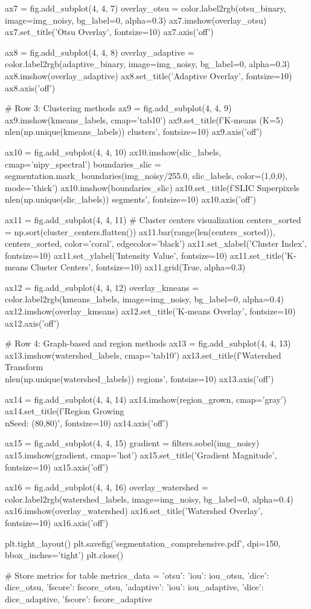 \documentclass[a4paper, 11pt]{article}
\begin{document}
\begin{pycode}
ax7 = fig.add_subplot(4, 4, 7)
overlay_otsu = color.label2rgb(otsu_binary, image=img_noisy, bg_label=0, alpha=0.3)
ax7.imshow(overlay_otsu)
ax7.set_title('Otsu Overlay', fontsize=10)
ax7.axis('off')

ax8 = fig.add_subplot(4, 4, 8)
overlay_adaptive = color.label2rgb(adaptive_binary, image=img_noisy, bg_label=0, alpha=0.3)
ax8.imshow(overlay_adaptive)
ax8.set_title('Adaptive Overlay', fontsize=10)
ax8.axis('off')

# Row 3: Clustering methods
ax9 = fig.add_subplot(4, 4, 9)
ax9.imshow(kmeans_labels, cmap='tab10')
ax9.set_title(f'K-means (K=5)\\n{len(np.unique(kmeans_labels))} clusters', fontsize=10)
ax9.axis('off')

ax10 = fig.add_subplot(4, 4, 10)
ax10.imshow(slic_labels, cmap='nipy_spectral')
boundaries_slic = segmentation.mark_boundaries(img_noisy/255.0, slic_labels, color=(1,0,0), mode='thick')
ax10.imshow(boundaries_slic)
ax10.set_title(f'SLIC Superpixels\\n{len(np.unique(slic_labels))} segments', fontsize=10)
ax10.axis('off')

ax11 = fig.add_subplot(4, 4, 11)
# Cluster centers visualization
centers_sorted = np.sort(cluster_centers.flatten())
ax11.bar(range(len(centers_sorted)), centers_sorted, color='coral', edgecolor='black')
ax11.set_xlabel('Cluster Index', fontsize=10)
ax11.set_ylabel('Intensity Value', fontsize=10)
ax11.set_title('K-means Cluster Centers', fontsize=10)
ax11.grid(True, alpha=0.3)

ax12 = fig.add_subplot(4, 4, 12)
overlay_kmeans = color.label2rgb(kmeans_labels, image=img_noisy, bg_label=0, alpha=0.4)
ax12.imshow(overlay_kmeans)
ax12.set_title('K-means Overlay', fontsize=10)
ax12.axis('off')

# Row 4: Graph-based and region methods
ax13 = fig.add_subplot(4, 4, 13)
ax13.imshow(watershed_labels, cmap='tab10')
ax13.set_title(f'Watershed Transform\\n{len(np.unique(watershed_labels))} regions', fontsize=10)
ax13.axis('off')

ax14 = fig.add_subplot(4, 4, 14)
ax14.imshow(region_grown, cmap='gray')
ax14.set_title(f'Region Growing\\nSeed: (80,80)', fontsize=10)
ax14.axis('off')

ax15 = fig.add_subplot(4, 4, 15)
gradient = filters.sobel(img_noisy)
ax15.imshow(gradient, cmap='hot')
ax15.set_title('Gradient Magnitude', fontsize=10)
ax15.axis('off')

ax16 = fig.add_subplot(4, 4, 16)
overlay_watershed = color.label2rgb(watershed_labels, image=img_noisy, bg_label=0, alpha=0.4)
ax16.imshow(overlay_watershed)
ax16.set_title('Watershed Overlay', fontsize=10)
ax16.axis('off')

plt.tight_layout()
plt.savefig('segmentation_comprehensive.pdf', dpi=150, bbox_inches='tight')
plt.close()

# Store metrics for table
metrics_data = {
    'otsu': {'iou': iou_otsu, 'dice': dice_otsu, 'fscore': fscore_otsu},
    'adaptive': {'iou': iou_adaptive, 'dice': dice_adaptive, 'fscore': fscore_adaptive}
}
\end{pycode}
\end{document}
